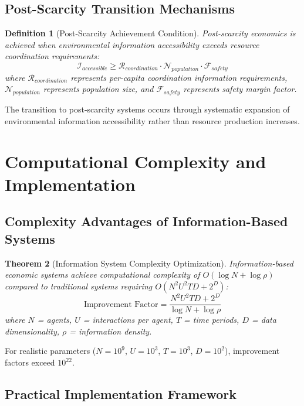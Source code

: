 \documentclass[12pt,a4paper]{article}
\newtheorem{theorem}{Theorem}
\newtheorem{definition}[theorem]{Definition}
\begin{document}
\subsection{Post-Scarcity Transition Mechanisms}

\begin{definition}[Post-Scarcity Achievement Condition]
Post-scarcity economics is achieved when environmental information accessibility exceeds resource coordination requirements:
\begin{equation}
\mathcal{I}_{accessible} \geq \mathcal{R}_{coordination} \cdot \mathcal{N}_{population} \cdot \mathcal{F}_{safety}
\end{equation}
where $\mathcal{R}_{coordination}$ represents per-capita coordination information requirements, $\mathcal{N}_{population}$ represents population size, and $\mathcal{F}_{safety}$ represents safety margin factor.
\end{definition}

The transition to post-scarcity systems occurs through systematic expansion of environmental information accessibility rather than resource production increases.

\section{Computational Complexity and Implementation}

\subsection{Complexity Advantages of Information-Based Systems}

\begin{theorem}[Information System Complexity Optimization]
Information-based economic systems achieve computational complexity of $O(\log N + \log \rho)$ compared to traditional systems requiring $O(N^2 U^2 T D + 2^D)$:
\begin{equation}
\text{Improvement Factor} = \frac{N^2 U^2 T D + 2^D}{\log N + \log \rho}
\end{equation}
where $N$ = agents, $U$ = interactions per agent, $T$ = time periods, $D$ = data dimensionality, $\rho$ = information density.
\end{theorem}

For realistic parameters ($N = 10^9$, $U = 10^3$, $T = 10^3$, $D = 10^2$), improvement factors exceed $10^{22}$.

\subsection{Practical Implementation Framework}
\end{document}
